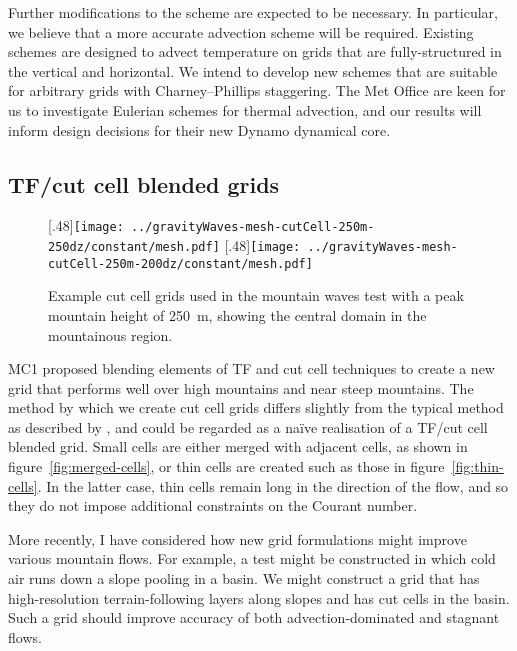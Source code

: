 \documentclass[a4paper]{article}
\begin{document}
Further modifications to the scheme are expected to be necessary.  In particular, we believe that a more accurate advection scheme will be required.
Existing schemes are designed to advect temperature on grids that are fully-structured in the vertical and horizontal.  We intend to develop new schemes that are suitable for arbitrary grids with Charney--Phillips staggering.
The Met Office are keen for us to investigate Eulerian schemes for thermal advection, and our results will inform design decisions for their new Dynamo dynamical core.  

\subsection*{TF/cut cell blended grids}
\begin{figure}
	\centering
	[.48\linewidth]{\texttt{[image: ../gravityWaves-mesh-cutCell-250m-250dz/constant/mesh.pdf]}}
	[.48\linewidth]{\texttt{[image: ../gravityWaves-mesh-cutCell-250m-200dz/constant/mesh.pdf]}}
%
	\caption{Example cut cell grids used in the mountain waves test with a peak mountain height of \SI{250}{\meter}, showing the central domain in the mountainous region.}
	\label{fig:cutCell-grids}
\end{figure}
MC1 proposed blending elements of TF and cut cell techniques to create a new grid that performs well over high mountains and near steep mountains.
The method by which we create cut cell grids differs slightly from the typical method as described by \citet{adcroft1997}, and could be regarded as a na\"{i}ve realisation of a TF/cut cell blended grid.  Small cells are either merged with adjacent cells, as shown in figure~\ref{fig:merged-cells}, or thin cells are created such as those in figure~\ref{fig:thin-cells}.  In the latter case, thin cells remain long in the direction of the flow, and so they do not impose additional constraints on the Courant number.  

More recently, I have considered how new grid formulations might improve various mountain flows.  For example, a test might be constructed in which cold air runs down a slope pooling in a basin.  We might construct a grid that has high-resolution terrain-following layers along slopes and has cut cells in the basin.  Such a grid should improve accuracy of both advection-dominated and stagnant flows.
\end{document}
